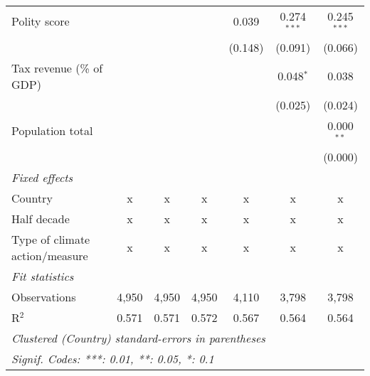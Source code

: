 \begin{tabular}{lcccccc}
   Polity score                                               &              &               &                & 0.039          & 0.274$^{***}$  & 0.245$^{***}$\\   
                                                              &              &               &                & (0.148)        & (0.091)        & (0.066)\\   
   Tax revenue (\% of GDP)                                    &              &               &                &                & 0.048$^{*}$    & 0.038\\   
                                                              &              &               &                &                & (0.025)        & (0.024)\\   
   Population total                                           &              &               &                &                &                & 0.000$^{**}$\\   
                                                              &              &               &                &                &                & (0.000)\\   
   \emph{Fixed effects}\\
   Country                                                    & x            & x             & x              & x              & x              & x\\  
   Half decade                                                & x            & x             & x              & x              & x              & x\\  
   Type of climate action/measure                             & x            & x             & x              & x              & x              & x\\  
   \midrule \emph{Fit statistics}\\
   Observations                                               & 4,950        & 4,950         & 4,950          & 4,110          & 3,798          & 3,798\\  
   R$^2$                                                      & 0.571        & 0.571         & 0.572          & 0.567          & 0.564          & 0.564\\  
   \midrule
   \multicolumn{7}{l}{\emph{Clustered (Country) standard-errors in parentheses}}\\
   \multicolumn{7}{l}{\emph{Signif. Codes: ***: 0.01, **: 0.05, *: 0.1}}\\
\end{tabular}
\par\endgroup


